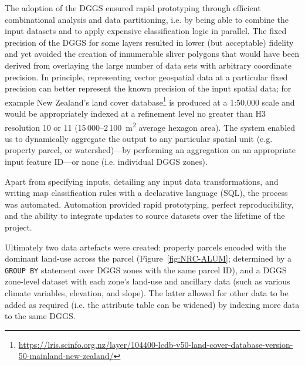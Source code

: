 \documentclass[]{interact}
\theoremstyle{plain}%
\theoremstyle{definition}
\theoremstyle{remark}
\begin{document}
The adoption of the \ac{DGGS} ensured rapid prototyping through efficient combinational analysis and data partitioning, i.e. by being able to combine the input datasets and to apply expensive classification logic in parallel. The fixed precision of the \ac{DGGS} for some layers resulted in lower (but acceptable) fidelity and yet avoided the creation of innumerable sliver polygons that would have been derived from overlaying the large number of data sets with arbitrary coordinate precision. In principle, representing vector geospatial data at a particular fixed precision can better represent the known precision of the input spatial data; for example New Zealand's land cover database\footnote{\url{https://lris.scinfo.org.nz/layer/104400-lcdb-v50-land-cover-database-version-50-mainland-new-zealand/}} is produced at a 1:50,000 scale and would be appropriately indexed at a refinement level no greater than H3 resolution 10 or 11 (15\,000--2\,100~\si{m^{2}} average hexagon area). The system enabled us to dynamically aggregate the output to any particular spatial unit (e.g. property parcel, or watershed)---by performing an aggregation on an appropriate input feature ID---or none (i.e. individual \ac{DGGS} zones).

Apart from specifying inputs, detailing any input data transformations, and writing map classification rules with a declarative language (\ac{SQL}), the process was automated. Automation provided rapid prototyping, perfect reproducibility, and the ability to integrate updates to source datasets over the lifetime of the project.

Ultimately two data artefacts were created: property parcels encoded with the dominant land-use across the parcel (Figure~\ref{fig:NRC-ALUM}; determined by a \texttt{GROUP BY} statement over \ac{DGGS} zones with the same parcel ID), and a \ac{DGGS} zone-level dataset with each zone's land-use and ancillary data (such as various climate variables, elevation, and slope). The latter allowed for other data to be added as required (i.e. the attribute table can be widened) by indexing more data to the same DGGS.
\end{document}
